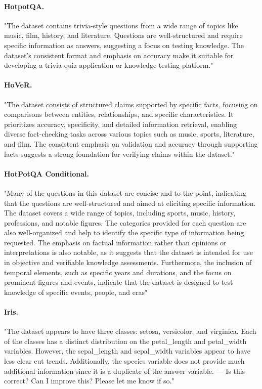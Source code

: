 \paragraph{HotpotQA.} "The dataset contains trivia-style questions from a wide range of topics like music, film, history, and literature. Questions are well-structured and require specific information as answers, suggesting a focus on testing knowledge. The dataset's consistent format and emphasis on accuracy make it suitable for developing a trivia quiz application or knowledge testing platform."

\paragraph{HoVeR.} "The dataset consists of structured claims supported by specific facts, focusing on comparisons between entities, relationships, and specific characteristics. It prioritizes accuracy, specificity, and detailed information retrieval, enabling diverse fact-checking tasks across various topics such as music, sports, literature, and film. The consistent emphasis on validation and accuracy through supporting facts suggests a strong foundation for verifying claims within the dataset."

\paragraph{HotPotQA Conditional.} "Many of the questions in this dataset are concise and to the point, indicating that the questions are well-structured and aimed at eliciting specific information. The dataset covers a wide range of topics, including sports, music, history, professions, and notable figures. The categories provided for each question are also well-organized and help to identify the specific type of information being requested. The emphasis on factual information rather than opinions or interpretations is also notable, as it suggests that the dataset is intended for use in objective and verifiable knowledge assessments. Furthermore, the inclusion of temporal elements, such as specific years and durations, and the focus on prominent figures and events, indicate that the dataset is designed to test knowledge of specific events, people, and eras"

\paragraph{Iris.} "The dataset appears to have three classes: setosa, versicolor, and virginica. Each of the classes has a distinct distribution on the petal\_length and petal\_width variables. However, the sepal\_length and sepal\_width variables appear to have less clear cut trends. Additionally, the species variable does not provide much additional information since it is a duplicate of the answer variable. ---
Is this correct? Can I improve this? Please let me know if so."

